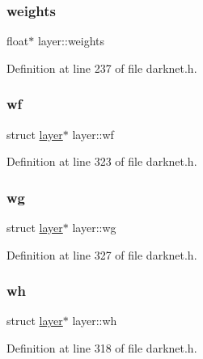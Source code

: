 \mbox{\label{structlayer_a552e6eca39a5d0dc6fa12901502c7e78}} 
\subsubsection{\texorpdfstring{weights}{weights}}
{\footnotesize\ttfamily float$\ast$ layer\+::weights}



Definition at line 237 of file darknet.\+h.

\mbox{\label{structlayer_a02dc5b80b7e15c4b4bd9d968ffbde662}} 
\subsubsection{\texorpdfstring{wf}{wf}}
{\footnotesize\ttfamily struct \mbox{\hyperlink{structlayer}{layer}}$\ast$ layer\+::wf}



Definition at line 323 of file darknet.\+h.

\mbox{\label{structlayer_ae2aa4b3552e0fd33370d332c3b318066}} 
\subsubsection{\texorpdfstring{wg}{wg}}
{\footnotesize\ttfamily struct \mbox{\hyperlink{structlayer}{layer}}$\ast$ layer\+::wg}



Definition at line 327 of file darknet.\+h.

\mbox{\label{structlayer_a2060deb333927330706e80f48129b7f0}} 
\subsubsection{\texorpdfstring{wh}{wh}}
{\footnotesize\ttfamily struct \mbox{\hyperlink{structlayer}{layer}}$\ast$ layer\+::wh}



Definition at line 318 of file darknet.\+h.

\mbox{\label{structlayer_aea3b1b349201ba0f9234d978e2b249a8}} 

